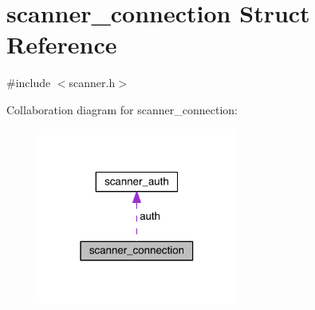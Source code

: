 \hypertarget{structscanner__connection}{}\section{scanner\+\_\+connection Struct Reference}
\label{structscanner__connection}


{\ttfamily \#include $<$scanner.\+h$>$}



Collaboration diagram for scanner\+\_\+connection\+:
\nopagebreak
\begin{figure}[H]
\begin{center}
\leavevmode
\includegraphics[width=186pt]{structscanner__connection__coll__graph}
\end{center}
\end{figure}
